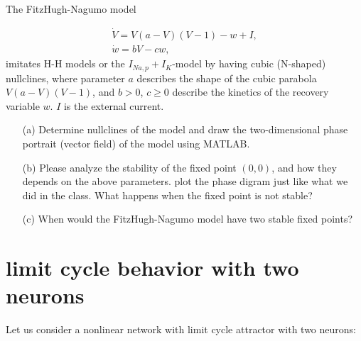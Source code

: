 \documentclass{article}
\begin{document}
The FitzHugh-Nagumo model 

\begin{eqnarray}
\dot{V} = V(a-V)(V-1) - w +I,\\
\dot{w} = bV -cw,
\end{eqnarray}
imitates H-H models or the $I_{Na,p} + I_K$-model by having cubic (N-shaped) nullclines, where parameter $a$ describes the shape of the cubic parabola $V(a-V)(V-1)$, and $b>0$, $c\ge 0$ describe the kinetics of the recovery variable $w$. $I$ is the external current.

\begin{enumerate}

\item[(a)] Determine nullclines of the model and draw the two-dimensional phase portrait (vector field) of the model using MATLAB. 
\item[(b)] Please analyze the stability of the fixed point $(0,0)$, and how they depends on the above parameters. plot the phase digram just like what we did in the class. What happens when the fixed point is not stable? 
\item[(c)] When would the FitzHugh-Nagumo model have two stable fixed points?

\end{enumerate}

\section*{limit cycle behavior with two neurons}

Let us consider a nonlinear network with limit cycle attractor with two neurons:
\end{document}
